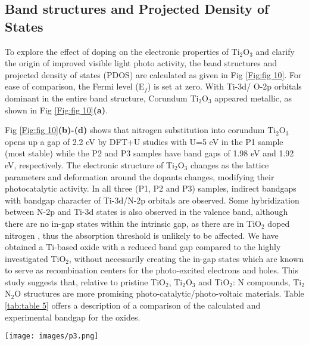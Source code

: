 \documentclass[aps,prb,superscriptaddress,twocolumn,floatfix,showpacs,amsmath]{revtex4-1}
\begin{document}
\subsection{Band structures and Projected Density of States}

To explore the effect of doping on the electronic properties of Ti$_{2}$O$_{3}$ and clarify the origin of improved visible light photo activity, the band structures and projected density of states (PDOS) are calculated as given in Fig \ref{Fig:fig 10}.  For ease of comparison, the Fermi level (E$_{f}$) is set at zero. With  Ti-3d/ O-2p orbitals dominant in the entire band structure, Corundum Ti$_{2}$O$_{3}$ appeared metallic, as shown in Fig \ref{Fig:fig 10}\textbf{(a)}. 

Fig \ref{Fig:fig 10}\textbf{(b)-(d)} shows that nitrogen substitution into corundum Ti$_{2}$O$_{3}$ opens up a gap of 2.2 eV by DFT+U studies with U=5 eV in the P1 sample (most stable) while the P2 and P3 samples have band gaps of 1.98 eV and 1.92 eV, respectively. The electronic structure of Ti$_{2}$O$_{3}$  changes as the lattice parameters and deformation around the dopants changes, modifying their photocatalytic activity. In all three (P1, P2 and P3) samples, indirect bandgaps with bandgap character of Ti-3d/N-2p orbitals are observed. Some hybridization between N-2p and Ti-3d states is also observed in the valence band, although there are no in-gap states within the intrinsic gap, as there are in TiO$_2$ doped nitrogen \cite{persson2006improved}, thus the absorption threshold is unlikely to be affected. We have obtained a Ti-based oxide with a reduced band gap compared to the highly investigated TiO$_{2}$,  without necessarily creating the in-gap states which are known to serve as recombination centers for the photo-excited electrons and holes. This study suggests that, relative to pristine TiO$_{2}$, Ti$_{2}$O$_{3}$ and TiO$_{2}$: N compounds, Ti$_{2}$N$_{2}$O structures are more promising photo-catalytic/photo-voltaic materials. Table \ref{tab:table 5} offers a description of a comparison of the calculated and experimental bandgap for the oxides.



\begin{figure*}[h]
   \texttt{[image: images/p3.png]}
    \caption{Band structures and Pdos for Corundum-based Ti$_{2}$N$_{2}$O\_P structures using DFT+U (U=5 eV) method.}
    \label{Fig:fig 10}
\end{figure*}
\end{document}
